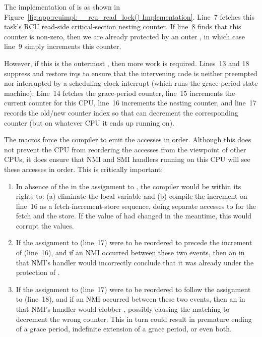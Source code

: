 The implementation of  is as shown in
Figure~\ref{fig:app:rcuimpl:__rcu_read_lock() Implementation}.
Line~7 fetches this task's RCU read-side critical-section nesting
counter.
If line~8 finds that this counter is non-zero,
then we are already protected by an outer
, in which case line~9 simply increments
this counter.

However, if this is the outermost ,
then more work is required.
Lines~13 and 18 suppress and restore irqs to ensure that the
intervening code is neither preempted nor interrupted by a
scheduling-clock interrupt (which runs the grace period state machine).
Line~14 fetches the grace-period counter,
line~15 increments the current counter for
this CPU, line~16 increments the nesting counter,
and line~17 records the old/new counter index so that
 can decrement the corresponding
counter (but on whatever CPU it ends up running on).

The  macros force the compiler to
emit the accesses in order.
Although this does not prevent the CPU from reordering the accesses
from the viewpoint of other CPUs, it does ensure that NMI and
SMI handlers running on this CPU will see these accesses in order.
This is critically important:

\begin{enumerate}
\item	In absence of the  in the assignment
	to , the compiler would be within its rights
	to: (a) eliminate the local variable  and
	(b) compile the increment on line~16 as a
	fetch-increment-store sequence, doing separate accesses to
	 for the fetch and the
	store.
	If the value of  had
	changed in the meantime, this would corrupt the
	 values.
\item	If the assignment to 
	(line~17) were to be reordered to precede the increment
	of  (line~16), and if an
	NMI occurred between these two events, then an
	 in that NMI's handler
	would incorrectly conclude that it was already under the
	protection of .
\item	If the assignment to 
        (line~17) were to be reordered to follow the assignment
	to  (line~18), and if an
	NMI occurred between these two events, then an
	 in that NMI's handler
	would clobber , possibly
	causing the matching  to
	decrement the wrong counter.
	This in turn could result in premature ending of a
	grace period, indefinite extension of a grace period,
	or even both.
\end{enumerate}

